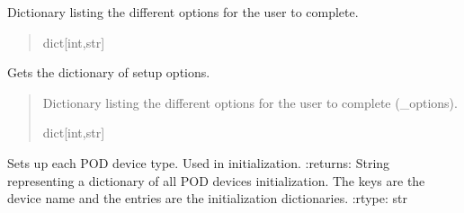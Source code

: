 \documentclass[letterpaper,10pt,english]{sphinxmanual}
\begin{document}
\begin{fulllineitems}
\begin{fulllineitems}
\end{fulllineitems}


\begin{fulllineitems}
\label{\detokenize{Setup_PodDevices:Setup_PodDevices.Setup_PodDevices._options}}
\pysigstartsignatures
{}
\pysigstopsignatures
\sphinxAtStartPar
Dictionary listing the different options for the user to complete.
\begin{quote}\begin{description}
\sphinxAtStartPar
dict{[}int,str{]}

\end{description}\end{quote}

\end{fulllineitems}


\begin{fulllineitems}
\label{\detokenize{Setup_PodDevices:Setup_PodDevices.Setup_PodDevices.GetOptions}}
\pysigstartsignatures
{}
\pysigstopsignatures
\sphinxAtStartPar
Gets the dictionary of setup options.
\begin{quote}\begin{description}
\sphinxAtStartPar
Dictionary listing the different options for the user to complete (\_options).

\sphinxAtStartPar
dict{[}int,str{]}

\end{description}\end{quote}

\end{fulllineitems}


\begin{fulllineitems}
\label{\detokenize{Setup_PodDevices:Setup_PodDevices.Setup_PodDevices.GetPODparametersInit}}
\pysigstartsignatures
{}
\pysigstopsignatures
\sphinxAtStartPar
Sets up each POD device type. Used in initialization.
:returns: String representing a dictionary of all POD devices initialization. The keys are the                 device name and the entries are the initialization dictionaries.
:rtype: str


\end{fulllineitems}
\end{fulllineitems}
\end{document}
